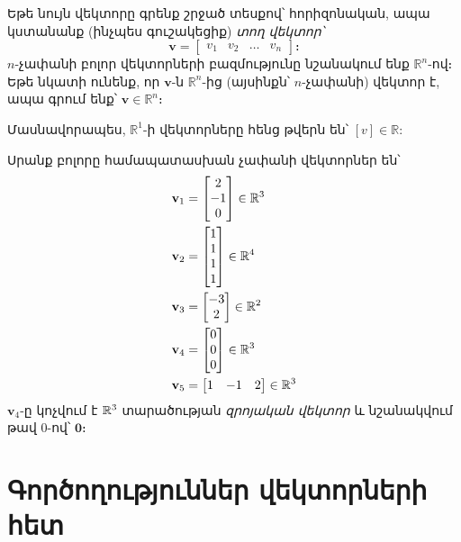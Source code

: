 Եթե նույն վեկտորը գրենք շրջած տեսքով՝ հորիզոնական, ապա կստանանք (ինչպես գուշակեցիք) \textit{տող վեկտոր՝}
\[\mathbf{v} = \begin{bmatrix} v_1 & v_2 & \ldots & v_n \end{bmatrix}։\]
$n$-չափանի բոլոր վեկտորների բազմությունը նշանակում ենք \( \mathbb{R}^n\)-ով։ Եթե նկատի ունենք, որ $\mathbf{v}$-ն \( \mathbb{R}^n \)-ից (այսինքն՝ $n$-չափանի) վեկտոր է, ապա գրում ենք՝ $\mathbf{v} \in \mathbb{R}^n$։


Մասնավորապես, $\mathbb{R}^1$-ի վեկտորները հենց թվերն են՝ $[v]\in\mathbb{R}$:

\begin{example} 
Սրանք բոլորը համապատասխան չափանի վեկտորներ են՝
 \begin{align*}
    \mathbf{v}_1 &= \begin{bmatrix} 2 \\ -1 \\ 0 \end{bmatrix} \in \mathbb{R}^3 \\
    \mathbf{v}_2 &= \begin{bmatrix} 1 \\ 1 \\ 1 \\ 1 \end{bmatrix} \in \mathbb{R}^4 \\
    \mathbf{v}_3 &= \begin{bmatrix} -3 \\ 2 \end{bmatrix}\in \mathbb{R}^2 \\
    \mathbf{v}_4 &= \begin{bmatrix} 0 \\ 0 \\ 0 \end{bmatrix} \in \mathbb{R}^3 \\
    \mathbf{v}_5 &= \begin{bmatrix} 1 & -1 & 2 \end{bmatrix} \in \mathbb{R}^3
  \end{align*}
$\mathbf{v}_4$-ը կոչվում է $\mathbb{R}^3$ տարածության \textit{զրոյական վեկտոր} և նշանակվում թավ $0$-ով՝ $\mathbf{0}$։
\end{example}


 
\section{Գործողություններ վեկտորների հետ}

